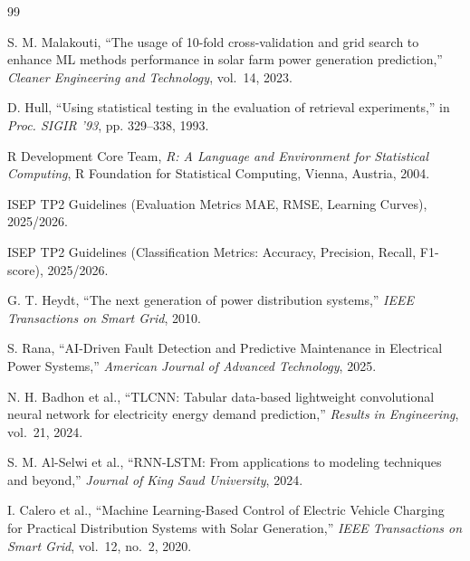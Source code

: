 \documentclass[conference]{IEEEtran}
\begin{document}
\begin{thebibliography}{99}

S. M. Malakouti, ``The usage of 10-fold cross-validation and grid search to enhance ML methods performance in solar farm power generation prediction,'' \textit{Cleaner Engineering and Technology}, vol.~14, 2023.

D. Hull, ``Using statistical testing in the evaluation of retrieval experiments,'' in \textit{Proc. SIGIR '93}, pp. 329--338, 1993.

R Development Core Team, \textit{R: A Language and Environment for Statistical Computing}, R Foundation for Statistical Computing, Vienna, Austria, 2004.

ISEP TP2 Guidelines (Evaluation Metrics MAE, RMSE, Learning Curves), 2025/2026.

ISEP TP2 Guidelines (Classification Metrics: Accuracy, Precision, Recall, F1-score), 2025/2026.


G. T. Heydt, ``The next generation of power distribution systems,'' \textit{IEEE Transactions on Smart Grid}, 2010.

S. Rana, ``AI-Driven Fault Detection and Predictive Maintenance in Electrical Power Systems,'' \textit{American Journal of Advanced Technology}, 2025.


N. H. Badhon et al., ``TLCNN: Tabular data-based lightweight convolutional neural network for electricity energy demand prediction,'' \textit{Results in Engineering}, vol.~21, 2024.

S. M. Al-Selwi et al., ``RNN-LSTM: From applications to modeling techniques and beyond,'' \textit{Journal of King Saud University}, 2024.

I. Calero et al., ``Machine Learning-Based Control of Electric Vehicle Charging for Practical Distribution Systems with Solar Generation,'' \textit{IEEE Transactions on Smart Grid}, vol.~12, no.~2, 2020.



\end{thebibliography}
\end{document}
